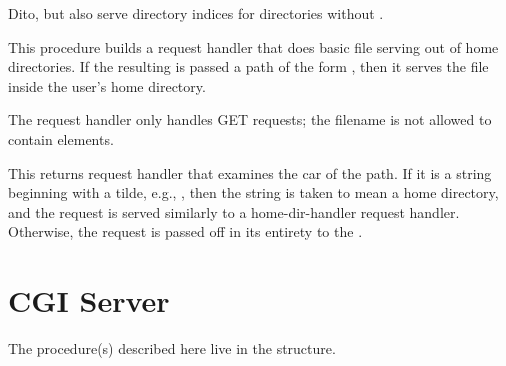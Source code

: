 \begin{desc}
Dito, but also serve directory indices for directories without
. 
\end{desc}

\begin{desc}
  This procedure builds a request handler that does basic file serving
  out of home directories. If the resulting  is
  passed a path of the form , then it serves the file
   inside the user's home directory.
    
  The request handler only handles GET requests; the filename is not
  allowed to contain  elements.
\end{desc}

\begin{desc}
  This returns request handler that examines the car of the path. If
  it is a string beginning with a tilde, e.g., , then the
  string is taken to mean a home directory, and the request is served
  similarly to a home-dir-handler request handler. Otherwise, the
  request is passed off in its entirety to the
  .
\end{desc}
 
\section{CGI Server}

The procedure(s) described here live in the 
structure.

